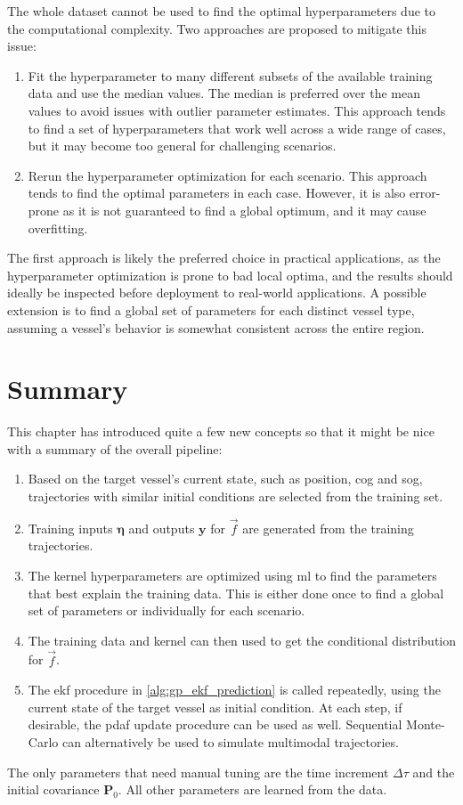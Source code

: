 The whole dataset cannot be used to find the optimal hyperparameters due to the computational complexity. Two approaches are proposed to mitigate this issue:
\begin{enumerate}
    \item Fit the hyperparameter to many different subsets of the available training data and use the median values. The median is preferred over the mean values to avoid issues with outlier parameter estimates. This approach tends to find a set of hyperparameters that work well across a wide range of cases, but it may become too general for challenging scenarios.
    \item Rerun the hyperparameter optimization for each scenario. This approach tends to find the optimal parameters in each case. However, it is also error-prone as it is not guaranteed to find a global optimum, and it may cause overfitting.
\end{enumerate}

The first approach is likely the preferred choice in practical applications, as the hyperparameter optimization is prone to bad local optima, and the results should ideally be inspected before deployment to real-world applications. A possible extension is to find a global set of parameters for each distinct vessel type, assuming a vessel's behavior is somewhat consistent across the entire region.

\section{Summary}
This chapter has introduced quite a few new concepts so that it might be nice with a summary of the overall pipeline:

\begin{enumerate}
    \item Based on the target vessel's current state, such as position, \acrshort{cog} and \acrshort{sog}, trajectories with similar initial conditions are selected from the training set.
    \item Training inputs $\boldsymbol{\eta}$ and outputs $\boldsymbol{y}$ for $\vec{f}$ are generated from the training trajectories.
    \item The kernel hyperparameters are optimized using \acrshort{ml} to find the parameters that best explain the training data. This is either done once to find a global set of parameters or individually for each scenario.
    \item The training data and kernel can then used to get the conditional distribution for $\vec{f}$.
    \item The \acrshort{ekf} procedure in \cref{alg:gp_ekf_prediction} is called repeatedly, using the current state of the target vessel as initial condition. At each step, if desirable, the \acrshort{pdaf} update procedure can be used as well. Sequential Monte-Carlo can alternatively be used to simulate multimodal trajectories.
\end{enumerate}

The only parameters that need manual tuning are the time increment $\Delta \tau$ and the initial covariance $\boldsymbol{P}_0$. All other parameters are learned from the data.
